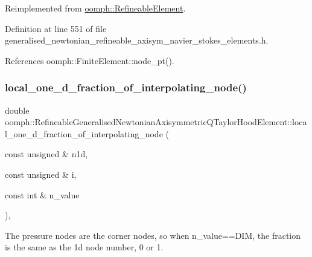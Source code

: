Reimplemented from \hyperlink{classoomph_1_1RefineableElement_ab27986fc2f6033a4758662cde78a7b76}{oomph\+::\+Refineable\+Element}.



Definition at line 551 of file generalised\+\_\+newtonian\+\_\+refineable\+\_\+axisym\+\_\+navier\+\_\+stokes\+\_\+elements.\+h.



References oomph\+::\+Finite\+Element\+::node\+\_\+pt().

\mbox{\label{classoomph_1_1RefineableGeneralisedNewtonianAxisymmetricQTaylorHoodElement_ae4e303afba918ad72418cd384d4da3c9}} 
\subsubsection{\texorpdfstring{local\+\_\+one\+\_\+d\+\_\+fraction\+\_\+of\+\_\+interpolating\+\_\+node()}{local\_one\_d\_fraction\_of\_interpolating\_node()}}
{\footnotesize\ttfamily double oomph\+::\+Refineable\+Generalised\+Newtonian\+Axisymmetric\+Q\+Taylor\+Hood\+Element\+::local\+\_\+one\+\_\+d\+\_\+fraction\+\_\+of\+\_\+interpolating\+\_\+node (\begin{DoxyParamCaption}\item[{const unsigned \&}]{n1d,  }\item[{const unsigned \&}]{i,  }\item[{const int \&}]{n\+\_\+value }\end{DoxyParamCaption})\hspace{0.3cm}{\ttfamily [inline]}, {\ttfamily [virtual]}}



The pressure nodes are the corner nodes, so when n\+\_\+value==D\+IM, the fraction is the same as the 1d node number, 0 or 1. 




